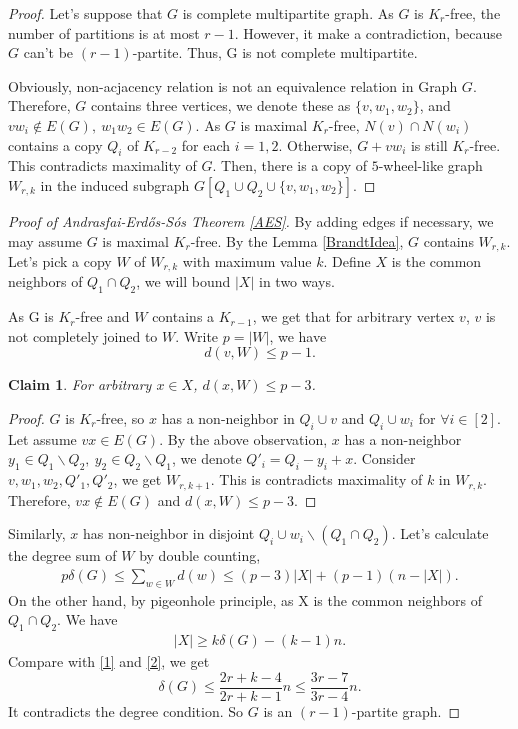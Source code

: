 \documentclass{article}
\newtheorem{claim}[theorem]{Claim}
\theoremstyle{definition}
\def\Erdos{Erd\H{o}s}
\begin{document}
\begin{proof}
Let's suppose that $G$ is complete multipartite graph. As $G$ is $K_r$-free,  the number of partitions is at most $r-1$. However, it make a contradiction, because $G$ can't be $(r-1)$-partite. Thus, G is not complete multipartite.

Obviously, non-acjacency relation is not an equivalence relation in Graph $G$. Therefore, $G$ contains three vertices, we denote these as $\{v,w_1,w_2\}$, and $vw_i \notin E(G),~w_1w_2 \in E(G)$. As $G$ is maximal $K_r$-free, $N(v) \cap N(w_i)$ contains a copy $Q_i$ of $K_{r-2}$ for each $i=1,2$. Otherwise, $G+vw_i$ is still $K_r$-free. This contradicts maximality of $G$. Then, there is a copy of $5$-wheel-like graph $W_{r,k}$ in the induced subgraph $G[Q_1 \cup Q_2 \cup \{v,w_1,w_2\}]$. 
\end{proof}

\begin{proof}[Proof of Andrasfai-\Erdos{}-S\'os Theorem \ref{AES}]
By adding edges if necessary, we may assume $G$ is maximal $K_r$-free. By the Lemma \ref{BrandtIdea}, $G$ contains $W_{r,k}$. Let's pick a copy $W$ of $W_{r,k}$ with maximum value $k$. Define $X$ is the common neighbors of $Q_1 \cap Q_2$, we will bound $|X|$ in two ways.

As G is $K_r$-free and $W$ contains a $K_{r-1}$, we get that for arbitrary vertex $v$, $v$ is not completely joined to $W$. Write $p=|W|$, we have
$$d(v,W) \le p-1.$$
\begin{claim}
    For arbitrary $x \in X$, $d(x,W) \le p-3$.
\end{claim}

\begin{proof}
$G$ is $K_r$-free, so $x$ has a non-neighbor in $Q_i \cup v$ and $Q_i \cup w_i$ for $\forall i \in [2]$. Let assume $vx \in E(G)$. By the above observation, $x$ has a non-neighbor $y_1 \in Q_1\backslash Q_2,~y_2 \in Q_2 \backslash Q_1$, we denote $Q'_i=Q_i-y_i+x$. Consider $v,w_1,w_2,Q'_1,Q'_2$, we get $W_{r,k+1}$. This is contradicts maximality of $k$ in $W_{r,k}$. Therefore, $vx \notin E(G)$ and $d(x,W) \le p-3$.
\end{proof}
Similarly, $x$ has non-neighbor in disjoint $Q_i \cup w_i \backslash (Q_1 \cap Q_2)$. Let's calculate the degree sum of $W$ by double counting,
\begin{align}\label{1}
p\delta(G) \le {\underset{w\in W}\sum}d(w) \le (p-3)|X|+(p-1)(n-|X|).
\end{align}
On the other hand, by pigeonhole principle, as X is the common neighbors of $Q_1 \cap Q_2$. We have 
\begin{align}\label{2}
	|X| \ge k\delta(G)-(k-1)n.
\end{align}
Compare with \eqref{1} and \eqref{2}, we get
$$\delta(G) \le \frac{2r+k-4}{2r+k-1}n \le \frac{3r-7}{3r-4}n.$$
It contradicts the degree condition. So $G$ is an $(r-1)$-partite graph.
\end{proof}
\end{document}

